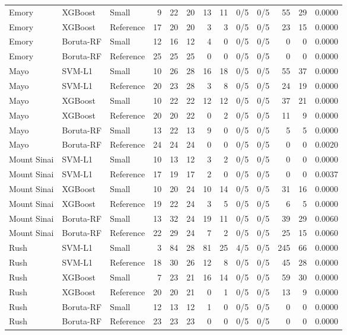 \begin{table}[H]
{\begin{tabular}{lllrrrrrrrrrr}
Emory & XGBoost & Small & 9 & 22 & 20 & 13 & 11 & 0/5 & 0/5 & 55 & 29 & 0.0000 \\
Emory & XGBoost & Reference & 17 & 20 & 20 & 3 & 3 & 0/5 & 0/5 & 23 & 15 & 0.0000 \\
Emory & Boruta-RF & Small & 12 & 16 & 12 & 4 & 0 & 0/5 & 0/5 & 0 & 0 & 0.0000 \\
Emory & Boruta-RF & Reference & 25 & 25 & 25 & 0 & 0 & 0/5 & 0/5 & 0 & 0 & 0.0000 \\
\addlinespace[2pt]
Mayo & SVM-L1 & Small & 10 & 26 & 28 & 16 & 18 & 0/5 & 0/5 & 55 & 37 & 0.0000 \\
Mayo & SVM-L1 & Reference & 20 & 23 & 28 & 3 & 8 & 0/5 & 0/5 & 24 & 19 & 0.0000 \\
Mayo & XGBoost & Small & 10 & 22 & 22 & 12 & 12 & 0/5 & 0/5 & 37 & 21 & 0.0000 \\
Mayo & XGBoost & Reference & 20 & 20 & 22 & 0 & 2 & 0/5 & 0/5 & 11 & 9 & 0.0000 \\
Mayo & Boruta-RF & Small & 13 & 22 & 13 & 9 & 0 & 0/5 & 0/5 & 5 & 5 & 0.0000 \\
Mayo & Boruta-RF & Reference & 24 & 24 & 24 & 0 & 0 & 0/5 & 0/5 & 0 & 0 & 0.0020 \\
\addlinespace[2pt]
Mount Sinai & SVM-L1 & Small & 10 & 13 & 12 & 3 & 2 & 0/5 & 0/5 & 0 & 0 & 0.0000 \\
Mount Sinai & SVM-L1 & Reference & 17 & 19 & 17 & 2 & 0 & 0/5 & 0/5 & 0 & 0 & 0.0037 \\
Mount Sinai & XGBoost & Small & 10 & 20 & 24 & 10 & 14 & 0/5 & 0/5 & 31 & 16 & 0.0000 \\
Mount Sinai & XGBoost & Reference & 19 & 22 & 24 & 3 & 5 & 0/5 & 0/5 & 6 & 5 & 0.0000 \\
Mount Sinai & Boruta-RF & Small & 13 & 32 & 24 & 19 & 11 & 0/5 & 0/5 & 39 & 29 & 0.0060 \\
Mount Sinai & Boruta-RF & Reference & 22 & 29 & 24 & 7 & 2 & 0/5 & 0/5 & 25 & 15 & 0.0060 \\
\addlinespace[2pt]
Rush & SVM-L1 & Small & 3 & 84 & 28 & 81 & 25 & 4/5 & 0/5 & 245 & 66 & 0.0000 \\
Rush & SVM-L1 & Reference & 18 & 30 & 26 & 12 & 8 & 0/5 & 0/5 & 45 & 28 & 0.0000 \\
Rush & XGBoost & Small & 7 & 23 & 21 & 16 & 14 & 0/5 & 0/5 & 59 & 30 & 0.0000 \\
Rush & XGBoost & Reference & 20 & 20 & 21 & 0 & 1 & 0/5 & 0/5 & 13 & 9 & 0.0000 \\
Rush & Boruta-RF & Small & 12 & 13 & 12 & 1 & 0 & 0/5 & 0/5 & 0 & 0 & 0.0000 \\
Rush & Boruta-RF & Reference & 23 & 23 & 23 & 0 & 0 & 0/5 & 0/5 & 0 & 0 & 0.0000 \\
\bottomrule
\end{tabular}}
\end{table}


